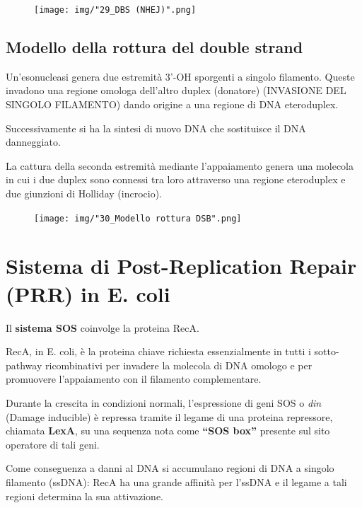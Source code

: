 \documentclass[11pt]{book}
\begin{document}
\clearpage
\begin{figure}[htp]
\centering
\texttt{[image: img/"29\_DBS (NHEJ)".png]}
\caption{}
\label{}
\end{figure}


\subsection{Modello della rottura del double
strand}\label{modello-della-rottura-del-double-strand}

Un'esonucleasi genera due estremità 3'-OH sporgenti a singolo filamento.
Queste invadono una regione omologa dell'altro duplex (donatore)
(INVASIONE DEL SINGOLO FILAMENTO) dando origine a una regione di DNA
eteroduplex.

Successivamente si ha la sintesi di nuovo DNA che sostituisce il DNA
danneggiato.

La cattura della seconda estremità mediante l'appaiamento genera una
molecola in cui i due duplex sono connessi tra loro attraverso una
regione eteroduplex e due giunzioni di Holliday (incrocio).

\begin{figure}[htp]
\centering
\texttt{[image: img/"30\_Modello rottura DSB".png]}
\caption{}
\label{modello-rottura-dsb}
\end{figure}

\clearpage
\section{Sistema di Post-Replication Repair (PRR) in E.
coli}\label{sistema-di-post-replication-repair-prr-in-e.-coli}

Il \textbf{sistema SOS} coinvolge la proteina RecA.

RecA, in E. coli, è la proteina chiave richiesta essenzialmente in
tutti i sotto-pathway ricombinativi per invadere la molecola di DNA
omologo e per promuovere l'appaiamento con il filamento complementare.

Durante la crescita in condizioni normali, l'espressione di geni SOS o
\emph{din} (Damage inducible) è repressa tramite il legame di una
proteina repressore, chiamata \textbf{LexA}, su una sequenza nota come
\textbf{``SOS box''} presente sul sito operatore di tali geni.

Come conseguenza a danni al DNA si accumulano regioni di DNA a singolo
filamento (ssDNA): RecA ha una grande affinità per l'ssDNA e il legame a
tali regioni determina la sua attivazione.
\end{document}
